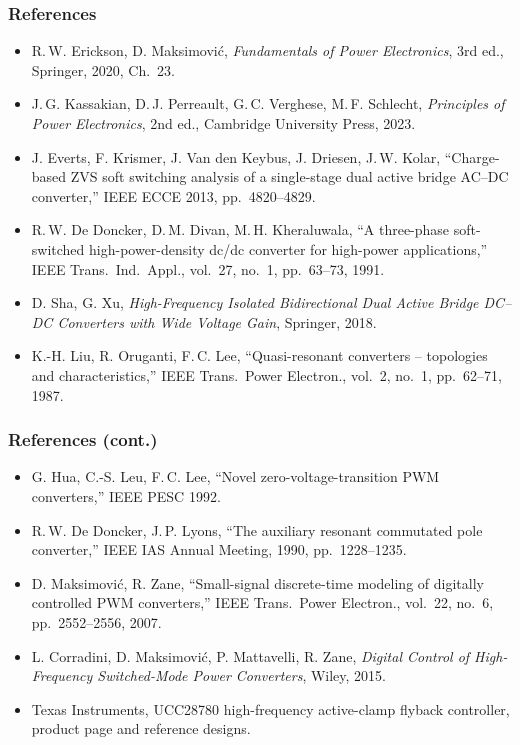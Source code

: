 \begin{frame}
	\frametitle{References}
	\scriptsize
	\begin{itemize}
		\item R.\,W. Erickson, D. Maksimovi\'c, \textit{Fundamentals of Power Electronics}, 3rd ed., Springer, 2020, Ch.\ 23.
		\item J.\,G. Kassakian, D.\,J. Perreault, G.\,C. Verghese, M.\,F. Schlecht, \textit{Principles of Power Electronics}, 2nd ed., Cambridge University Press, 2023.
		\item J. Everts, F. Krismer, J. Van den Keybus, J. Driesen, J.\,W. Kolar, ``Charge-based ZVS soft switching analysis of a single-stage dual active bridge AC--DC converter,'' IEEE ECCE 2013, pp.\ 4820--4829.
		\item R.\,W. De Doncker, D.\,M. Divan, M.\,H. Kheraluwala, ``A three-phase soft-switched high-power-density dc/dc converter for high-power applications,'' IEEE Trans.\ Ind.\ Appl., vol.\ 27, no.\ 1, pp.\ 63--73, 1991.
		\item D. Sha, G. Xu, \textit{High-Frequency Isolated Bidirectional Dual Active Bridge DC--DC Converters with Wide Voltage Gain}, Springer, 2018.
		\item K.-H. Liu, R. Oruganti, F.\,C. Lee, ``Quasi-resonant converters -- topologies and characteristics,'' IEEE Trans.\ Power Electron., vol.\ 2, no.\ 1, pp.\ 62--71, 1987.
	\end{itemize}
\end{frame}

\begin{frame}
	\frametitle{References (cont.)}
	\scriptsize
	\begin{itemize}
		\item G. Hua, C.-S. Leu, F.\,C. Lee, ``Novel zero-voltage-transition PWM converters,'' IEEE PESC 1992.
		\item R.\,W. De Doncker, J.\,P. Lyons, ``The auxiliary resonant commutated pole converter,'' IEEE IAS Annual Meeting, 1990, pp.\ 1228--1235.
		\item D. Maksimovi\'c, R. Zane, ``Small-signal discrete-time modeling of digitally controlled PWM converters,'' IEEE Trans.\ Power Electron., vol.\ 22, no.\ 6, pp.\ 2552--2556, 2007.
		\item L. Corradini, D. Maksimovi\'c, P. Mattavelli, R. Zane, \textit{Digital Control of High-Frequency Switched-Mode Power Converters}, Wiley, 2015.
		\item Texas Instruments, UCC28780 high-frequency active-clamp flyback controller, product page and reference designs.
	\end{itemize}
\end{frame}
